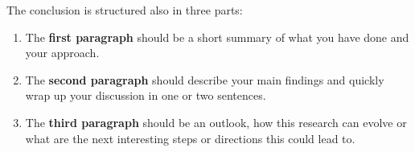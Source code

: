 The conclusion is structured also in three parts:

\begin{enumerate}
    \item The \textbf{first paragraph} should be a short summary of what you have done and your approach.
    \item The \textbf{second paragraph} should describe your main findings and quickly wrap up your discussion in one or two sentences. 
    \item The \textbf{third paragraph} should be an outlook, how this research can evolve or what are the next interesting steps or directions this could lead to. 
\end{enumerate}

 



